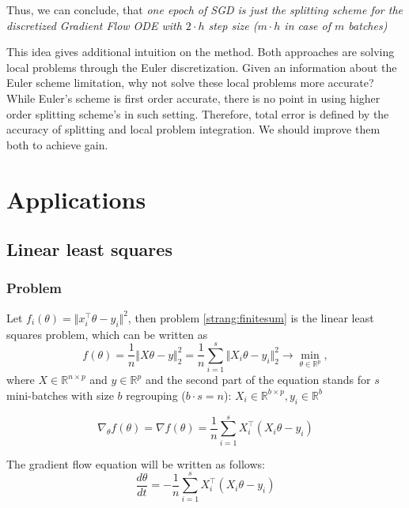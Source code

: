 \documentclass{article}
\begin{document}
Thus, we can conclude, that \textit{one epoch of SGD is just the splitting scheme for the discretized Gradient Flow ODE with $2 \cdot h$ step size ($m \cdot h$ in case of $m$ batches)}

This idea gives additional intuition on the method. Both approaches are solving local problems through the Euler discretization. Given an information about the Euler scheme limitation, why not solve these local problems more accurate? While Euler's scheme is first order accurate, there is no point in using higher order splitting scheme's in such setting. Therefore, total error is defined by the accuracy of splitting and local problem integration. We should improve them both to achieve gain.


\section{Applications}
\subsection{Linear least squares}
\subsubsection{Problem}
Let $f_i(\theta) = \Vert x_i^{\top} \theta - y_i \Vert^2$, then problem \eqref{strang:finitesum} is the linear least squares problem, which can be written as
\begin{equation}\label{strang:LLS}
   f(\theta) = \frac{1}{n}\Vert X \theta - y \Vert_2^2  = \frac{1}{n}\sum\limits_{i=1}^s\Vert X_i \theta - y_i \Vert_2^2\to \min_{\theta \in \mathbb{R}^p},
\end{equation}
where $X \in \mathbb{R}^{n \times p}$ and $y \in \mathbb{R}^p$ and the second part of the equation stands for $s$ mini-batches with size $b$ regrouping ($b \cdot s = n$): $X_i \in \mathbb{R}^{b \times p}, y_i \in \mathbb{R}^{b}$

\begin{equation}\label{strang:LLS_grad}
\nabla_\theta f(\theta) = \nabla f(\theta) = \frac{1}{n}\sum\limits_{i=1}^s X_i^\top( X_i \theta - y_i)
\end{equation}

The gradient flow equation will be written as follows:
\begin{equation}\label{strang:LLS_GF}
\frac{d \theta}{d t} = - \frac{1}{n}\sum\limits_{i=1}^s X_i^\top( X_i \theta - y_i)
\end{equation}
\end{document}
